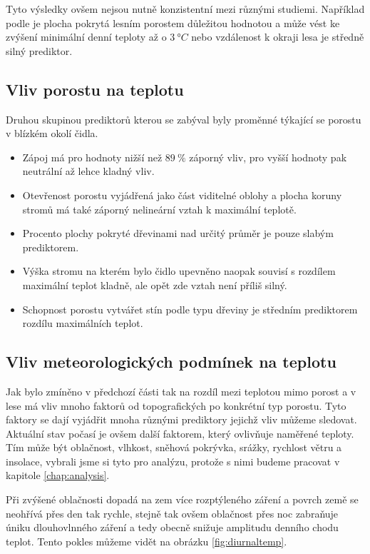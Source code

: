 Tyto výsledky ovšem nejsou nutně konzistentní mezi různými studiemi. Například podle \cite{GreiserCaroline2018Mmmi} je plocha pokrytá lesním porostem důležitou hodnotou a může vést ke zvýšení minimální denní teploty až o $\SI{3}{\degree C}$ nebo vzdálenost k okraji lesa je středně silný prediktor.

\subsection{Vliv porostu na teplotu}
Druhou skupinou prediktorů kterou se \cite{ZellwegerFlorian2019Sdou} zabýval byly proměnné týkající se porostu v blízkém okolí čidla.

\begin{itemize}
	\item Zápoj má pro hodnoty nižší než $\SI{89}{\%}$ záporný vliv, pro vyšší hodnoty pak neutrální až lehce kladný vliv.
	\item Otevřenost porostu vyjádřená jako část viditelné oblohy a plocha koruny stromů má také záporný nelineární vztah k maximální teplotě.
	\item Procento plochy pokryté dřevinami nad určitý průměr je pouze slabým prediktorem. 
	\item Výška stromu na kterém bylo čidlo upevněno naopak souvisí s rozdílem maximální teplot kladně, ale opět zde vztah není příliš silný.
	\item Schopnost porostu vytvářet stín podle typu dřeviny je středním prediktorem rozdílu maximálních teplot.
\end{itemize}

\subsection{Vliv meteorologických podmínek na teplotu}
Jak bylo zmíněno v předchozí části tak na rozdíl mezi teplotou mimo porost a v lese má vliv mnoho faktorů od topografických po konkrétní typ porostu. Tyto faktory se dají vyjádřit mnoha různými prediktory jejichž vliv můžeme sledovat. Aktuální stav počasí je ovšem další faktorem, který ovlivňuje naměřené teploty. Tím může být oblačnost, vlhkost, sněhová pokrývka, srážky, rychlost větru a insolace, vybrali jsme si tyto pro analýzu, protože s nimi budeme pracovat v kapitole \ref{chap:analysis}.

Při zvýšené oblačnosti dopadá na zem více rozptýleného záření a povrch země se neohřívá přes den tak rychle, stejně tak ovšem oblačnost přes noc zabraňuje úniku dlouhovlnného záření a tedy obecně snižuje amplitudu denního chodu teplot. Tento pokles můžeme vidět na obrázku \ref{fig:diurnaltemp}\cite{arya2001}.

